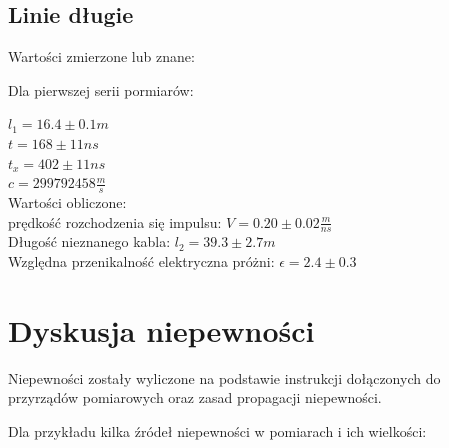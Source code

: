 \documentclass[a4paper,11pt]{article}
\begin{document}
\subsection{Linie długie}
Wartości zmierzone lub znane:

Dla pierwszej serii pormiarów:

\( l_1 = 16.4 \pm 0.1 m \) \\
\( t  = 168 \pm 11 ns \) \\
\( t_x = 402 \pm 11 ns \) \\
\( c = 299792458 \frac {m} {s} \) \\

Wartości obliczone:\\
prędkość rozchodzenia się impulsu:
\( V = 0.20 \pm 0.02 \frac {m} {ns} \) \\
Długość nieznanego kabla:
\( l_2 = 39.3 \pm 2.7 m \) \\
Względna przenikalność elektryczna próżni:
\( \epsilon = 2.4 \pm 0.3 \) \\

\section{Dyskusja niepewności}
Niepewności zostały wyliczone na podstawie instrukcji dołączonych do przyrządów pomiarowych oraz zasad propagacji niepewności.

Dla przykładu kilka źródeł niepewności w pomiarach i ich wielkości:
\end{document}
